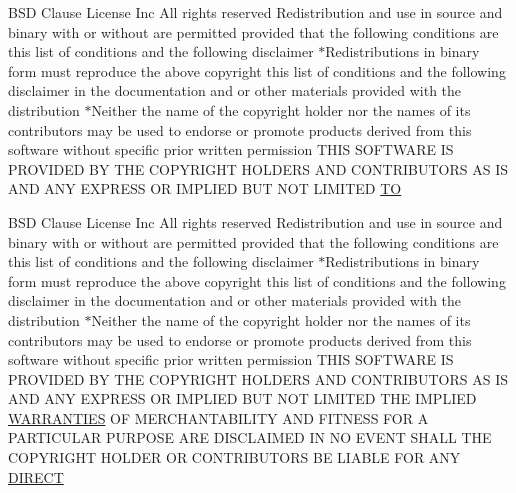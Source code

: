 \begin{DoxyCompactItemize}
\item 
B\+SD Clause License Inc All rights reserved Redistribution and use in source and binary with or without are permitted provided that the following conditions are this list of conditions and the following disclaimer $\ast$Redistributions in binary form must reproduce the above copyright this list of conditions and the following disclaimer in the documentation and or other materials provided with the distribution $\ast$Neither the name of the copyright holder nor the names of its contributors may be used to endorse or promote products derived from this software without specific prior written permission T\+H\+IS S\+O\+F\+T\+W\+A\+RE IS P\+R\+O\+V\+I\+D\+ED BY T\+HE C\+O\+P\+Y\+R\+I\+G\+HT H\+O\+L\+D\+E\+RS A\+ND C\+O\+N\+T\+R\+I\+B\+U\+T\+O\+RS AS IS A\+ND A\+NY E\+X\+P\+R\+E\+SS OR I\+M\+P\+L\+I\+ED B\+UT N\+OT L\+I\+M\+I\+T\+ED \hyperlink{LICENSE_8txt_a2c6391e9fede2624d7b114e2961298af}{TO}
\item 
B\+SD Clause License Inc All rights reserved Redistribution and use in source and binary with or without are permitted provided that the following conditions are this list of conditions and the following disclaimer $\ast$Redistributions in binary form must reproduce the above copyright this list of conditions and the following disclaimer in the documentation and or other materials provided with the distribution $\ast$Neither the name of the copyright holder nor the names of its contributors may be used to endorse or promote products derived from this software without specific prior written permission T\+H\+IS S\+O\+F\+T\+W\+A\+RE IS P\+R\+O\+V\+I\+D\+ED BY T\+HE C\+O\+P\+Y\+R\+I\+G\+HT H\+O\+L\+D\+E\+RS A\+ND C\+O\+N\+T\+R\+I\+B\+U\+T\+O\+RS AS IS A\+ND A\+NY E\+X\+P\+R\+E\+SS OR I\+M\+P\+L\+I\+ED B\+UT N\+OT L\+I\+M\+I\+T\+ED T\+HE I\+M\+P\+L\+I\+ED \hyperlink{LICENSE_8txt_a8472295fc7dc3e152751655a351cab17}{W\+A\+R\+R\+A\+N\+T\+I\+ES} OF M\+E\+R\+C\+H\+A\+N\+T\+A\+B\+I\+L\+I\+TY A\+ND F\+I\+T\+N\+E\+SS F\+OR A P\+A\+R\+T\+I\+C\+U\+L\+AR P\+U\+R\+P\+O\+SE A\+RE D\+I\+S\+C\+L\+A\+I\+M\+ED IN NO E\+V\+E\+NT S\+H\+A\+LL T\+HE C\+O\+P\+Y\+R\+I\+G\+HT H\+O\+L\+D\+ER OR C\+O\+N\+T\+R\+I\+B\+U\+T\+O\+RS BE L\+I\+A\+B\+LE F\+OR A\+NY \hyperlink{LICENSE_8txt_a34cac86a32266331f931bceaa138a96d}{D\+I\+R\+E\+CT}
\item 

\end{DoxyCompactItemize}
